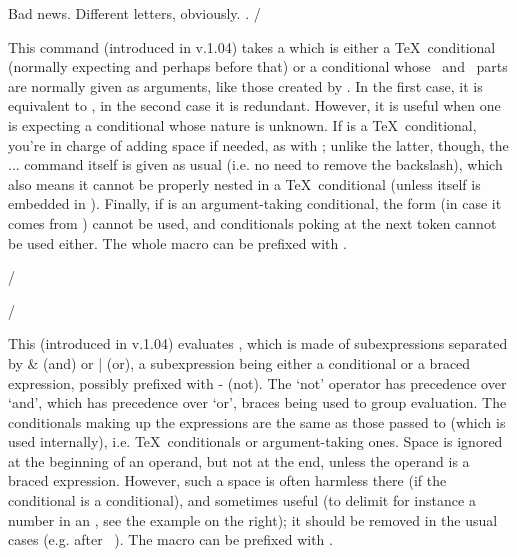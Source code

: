 \Example
                          {Bad news}.
\reverse{}
             {Different letters, obviously.}
.
\Example/

This command (introduced in v.1.04) takes a  which is
either a \TeX\ conditional (normally expecting \com\fi and perhaps \com\else
before that) or a conditional whose \true\ and \false\ parts are normally
given as arguments, like those created by \com\newife. In the first case, it
is equivalent to \com\straightenif, in the second case it is redundant.
However, it is useful when one is expecting a conditional whose nature is
unknown. If  is a \TeX\ conditional, you're in charge of
adding space if needed, as with \com\straightenif; unlike the latter, though,
the \com\if... command itself is given as usual (i.e. no need to remove the
backslash), which also means it cannot be properly nested in a \TeX\
conditional (unless itself is embedded in \com\straightenif). Finally, if
\arg{conditional} is an argument-taking conditional, the \tcode{iff} form (in
case it comes from \texapi) cannot be used, and conditionals poking at the
next token cannot be used either. The whole macro can be prefixed with
\com\reverse.

\Example
\newife\iftest
\reverse\iffwhatever{}
\Example/

\description/






This (introduced in v.1.04) evaluates , which is made of
subexpressions separated by \com& (and) or \com| (or), a subexpression being
either a conditional or a braced expression, possibly prefixed with \com-
(not). The `not' operator has precedence over `and', which has precedence over
`or', braces being used to group evaluation. The conditionals making up the
expressions are the same as those passed to \com\ifwhatever (which is used
internally), i.e. \TeX\ conditionals or argument-taking ones. Space is ignored
at the beginning of an operand, but not at the end, unless the operand is a
braced expression. However, such a space is often harmless there (if the
conditional is a \texapi conditional), and sometimes useful (to delimit for
instance a number in an \com\ifnum, see the example on the right); it should be
removed in the usual cases (e.g. after \com\ifcat\ \tcode{XY}). The macro can
be prefixed with \com\reverse.

